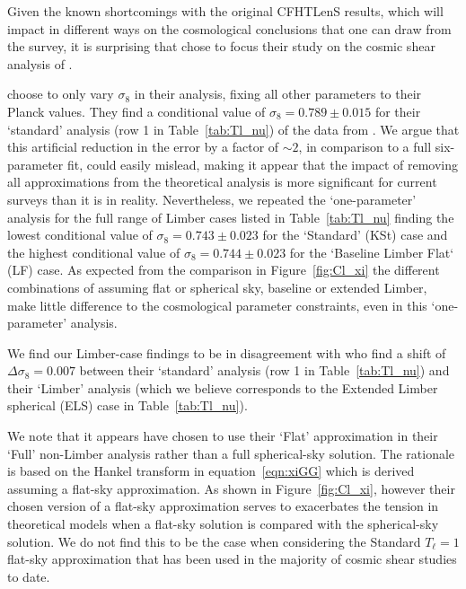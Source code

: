 Given the known shortcomings with the original CFHTLenS results, which will impact in different ways on the cosmological conclusions that one can draw from the survey, it is surprising that \citet{kitching/etal:2016} chose to focus their study on the cosmic shear analysis of \citet{kilbinger/etal:2013}.  

\citet{kitching/etal:2016} choose to only vary $\sigma_8$ in their analysis, fixing all other parameters to their Planck values. They find a conditional value of $\sigma_8 = 0.789 \pm 0.015$ for their `standard' analysis (row 1 in Table~\ref{tab:Tl_nu}) of the data from \citet{kilbinger/etal:2013}.    We argue that this artificial reduction in the error by a factor of $\sim 2$, in comparison to a full six-parameter fit, could easily mislead, making it appear that the impact of removing all approximations from the theoretical analysis is more significant for current surveys than it is in reality.  Nevertheless, we repeated the `one-parameter' analysis for the full range of Limber cases listed in Table~\ref{tab:Tl_nu} finding the lowest conditional value of $\sigma_8 = 0.743 \pm 0.023$ for the `Standard' (KSt) case and the highest conditional value of $\sigma_8 = 0.744 \pm 0.023$ for the `Baseline Limber Flat` (LF) case.  As expected from the comparison in Figure~\ref{fig:Cl_xi} the different combinations of assuming flat or spherical sky, baseline or extended Limber, make little difference to the cosmological parameter constraints, even in this `one-parameter' analysis.    

We find our Limber-case findings to be in disagreement with \citet{kitching/etal:2016} who find a shift of $\Delta \sigma_8 = 0.007$ between their `standard' analysis (row 1 in Table~\ref{tab:Tl_nu}) and their `Limber' analysis (which we believe corresponds to the Extended Limber spherical (ELS) case in Table~\ref{tab:Tl_nu}).  

We note that it appears \citet{kitching/etal:2016} have chosen to use their `Flat' approximation in their `Full' non-Limber analysis rather than a full spherical-sky solution.  The rationale is based on the Hankel transform in equation~\ref{eqn:xiGG} which is derived assuming a flat-sky approximation.  As shown in Figure~\ref{fig:Cl_xi}, however their chosen version of a flat-sky approximation serves to exacerbates the tension in theoretical models when a flat-sky solution is compared with the spherical-sky solution. We do not find this to be the case when considering the Standard $T_\ell = 1$ flat-sky approximation that has been used in the majority of cosmic shear studies to date.


